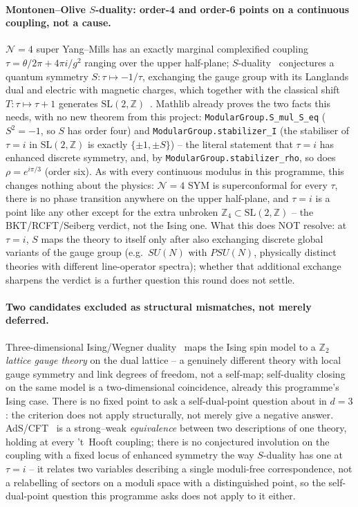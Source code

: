 \documentclass[11pt,a4paper]{article}
\newcommand{\lean}[1]{\texttt{\small #1}}
\begin{document}
\paragraph{Montonen--Olive $S$-duality: order-4 and order-6 points on a continuous coupling, not a cause.}
$\mathcal N=4$ super Yang--Mills has an exactly marginal complexified coupling $\tau=\theta/2\pi+4\pi i/g^2$
ranging over the upper half-plane; $S$-duality~\cite{MontonenOlive1977} conjectures a quantum symmetry
$S:\tau\mapsto-1/\tau$, exchanging the gauge group with its Langlands dual and electric with magnetic charges,
which together with the classical shift $T:\tau\mapsto\tau+1$ generates $\mathrm{SL}(2,\mathbb
Z)$~\cite{KapustinWitten2007}. Mathlib already proves the two facts this needs, with no new theorem from this
project: \lean{ModularGroup.S\_mul\_S\_eq} ($S^2=-1$, so $S$ has order four) and
\lean{ModularGroup.stabilizer\_I} (the stabiliser of $\tau=i$ in $\mathrm{SL}(2,\mathbb Z)$ is exactly
$\{\pm1,\pm S\}$) -- the literal statement that $\tau=i$ has enhanced discrete symmetry, and, by
\lean{ModularGroup.stabilizer\_rho}, so does $\rho=e^{i\pi/3}$ (order six). As with every continuous modulus in
this programme, this changes nothing about the physics: $\mathcal N=4$ SYM is superconformal for every $\tau$,
there is no phase transition anywhere on the upper half-plane, and $\tau=i$ is a point like any other except for
the extra unbroken $\mathbb Z_4\subset\mathrm{SL}(2,\mathbb Z)$ -- the BKT/RCFT/Seiberg verdict, not the Ising
one. What this does NOT resolve: at $\tau=i$, $S$ maps the theory to itself only after also exchanging discrete
global variants of the gauge group (e.g.\ $SU(N)$ with $PSU(N)$, physically distinct theories with different
line-operator spectra); whether that additional exchange sharpens the verdict is a further question this round
does not settle.

\paragraph{Two candidates excluded as structural mismatches, not merely deferred.} Three-dimensional Ising/Wegner
duality~\cite{Wegner1971} maps the Ising spin model to a $\mathbb Z_2$ \emph{lattice gauge theory} on the dual
lattice -- a genuinely different theory with local gauge symmetry and link degrees of freedom, not a self-map;
self-duality closing on the same model is a two-dimensional coincidence, already this programme's Ising case.
There is no fixed point to ask a self-dual-point question about in $d=3$: the criterion does not apply
structurally, not merely give a negative answer. AdS/CFT~\cite{Maldacena1998} is a strong--weak
\emph{equivalence} between two descriptions of one theory, holding at every 't~Hooft coupling; there is no
conjectured involution on the coupling with a fixed locus of enhanced symmetry the way $S$-duality has one at
$\tau=i$ -- it relates two variables describing a single moduli-free correspondence, not a relabelling of
sectors on a moduli space with a distinguished point, so the self-dual-point question this programme asks does
not apply to it either.
\end{document}
